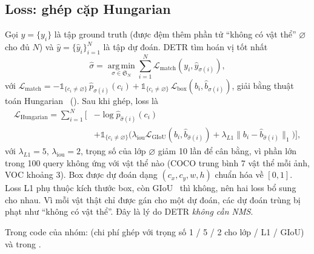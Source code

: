 \documentclass[11pt, a4paper]{article}
\begin{document}
\subsection{Loss: ghép cặp Hungarian}
Gọi $y = \{y_i\}$ là tập ground truth (được đệm thêm phần tử ``không có vật thể'' $\varnothing$ cho đủ $N$) và $\hat y = \{\hat y_i\}_{i=1}^N$ là tập dự đoán. DETR tìm hoán vị tốt nhất
\begin{equation}
  \hat\sigma = \operatorname*{arg\,min}_{\sigma \in \mathfrak{S}_N} \sum_{i=1}^{N} \mathcal{L}_{\text{match}}(y_i, \hat y_{\sigma(i)}),
\end{equation}
với $\mathcal{L}_{\text{match}} = -\mathbb{1}_{\{c_i \ne \varnothing\}}\,\hat p_{\sigma(i)}(c_i) + \mathbb{1}_{\{c_i \ne \varnothing\}}\,\mathcal{L}_{\text{box}}(b_i, \hat b_{\sigma(i)})$, giải bằng thuật toán Hungarian~\cite{kuhn1955hungarian} (). Sau khi ghép, loss là
\begin{equation}
  \begin{split}
  \mathcal{L}_{\text{Hungarian}} = \sum_{i=1}^{N} \Big[ & -\log \hat p_{\hat\sigma(i)}(c_i) \\
    & + \mathbb{1}_{\{c_i \ne \varnothing\}} \big( \lambda_{\text{iou}} \mathcal{L}_{\text{GIoU}}(b_i, \hat b_{\hat\sigma(i)}) + \lambda_{L1} \lVert b_i - \hat b_{\hat\sigma(i)} \rVert_1 \big) \Big],
  \end{split}
\end{equation}
với $\lambda_{L1} = 5$, $\lambda_{\text{iou}} = 2$, trọng số của lớp $\varnothing$ giảm 10 lần để cân bằng, vì phần lớn trong 100 query không ứng với vật thể nào (COCO trung bình 7 vật thể mỗi ảnh, VOC khoảng 3). Box được dự đoán dạng $(c_x, c_y, w, h)$ chuẩn hóa về $[0,1]$. Loss L1 phụ thuộc kích thước box, còn GIoU~\cite{rezatofighi2019giou} thì không, nên hai loss bổ sung cho nhau. Vì mỗi vật thật chỉ được gán cho một dự đoán, các dự đoán trùng bị phạt như ``không có vật thể''. Đây là lý do DETR \emph{không cần NMS}.

Trong code của nhóm:  (chi phí ghép với trọng số 1 / 5 / 2 cho lớp / L1 / GIoU) và  trong .
\end{document}
